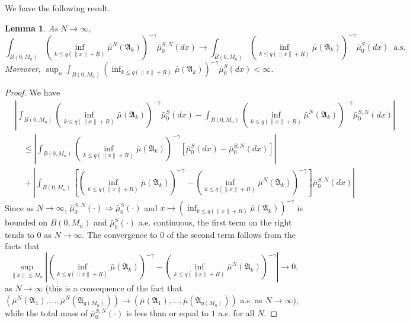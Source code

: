 \documentclass[notitlepage,reqno,11pt]{amsart}
\numberwithin{equation}{section}
\newtheorem{lemma}{Lemma}[section]
\begin{document}
We have the following result.
\begin{lemma}
\label{lemEP}
As $N\to\infty$,
\[\int_{B(0,M_n)}\left(\inf_{k\le q(\|x\|+\underline{R})}\bar{\mu}^N(\mathfrak{A}_k)\right)^{-\gamma}\bar{\mu}^{S,N}_0(dx)
\to\int_{B(0,M_n)}\left(\inf_{k\le q(\|x\|+\underline{R})}\bar{\mu}(\mathfrak{A}_k)\right)^{-\gamma}\bar{\mu}^{S}_0(dx)\ \text{ a.s.}\]
Moreover, 
$\displaystyle \sup_n\int_{B(0,M_n)}\left(\inf_{k\le q(\|x\|+\underline{R})}\bar{\mu}(\mathfrak{A}_k)\right)^{-\gamma}\bar{\mu}^{S}_0(dx)<\infty$.
\end{lemma}
\begin{proof}
We have
\begin{align*}
&\left|\int_{B(0,M_n)}\left(\inf_{k\le q(\|x\|+\underline{R})}\bar{\mu}(\mathfrak{A}_k)\right)^{-\gamma}\bar{\mu}^{S}_0(dx)-
\int_{B(0,M_n)}\left(\inf_{k\le q(\|x\|+\underline{R})}\bar{\mu}^N(\mathfrak{A}_k)\right)^{-\gamma}\bar{\mu}^{S,N}_0(dx)\right|\\
&\quad \le\left|\int_{B(0,M_n)}\left(\inf_{k\le q(\|x\|+\underline{R})}\bar{\mu}(\mathfrak{A}_k)\right)^{-\gamma}\left[\bar{\mu}^{S}_0(dx)-
\bar{\mu}^{S,N}_0(dx)\right]\right|\\
&\quad+\left|\int_{B(0,M_n)}\left[\left(\inf_{k\le q(\|x\|+\underline{R})}\bar{\mu}(\mathfrak{A}_k)\right)^{-\gamma}-
\left(\inf_{k\le q(\|x\|+\underline{R})}\bar{\mu}^N(\mathfrak{A}_k)\right)^{-\gamma}\right]\bar{\mu}^{S,N}_0(dx)\right|
\end{align*}
Since  as $N\to\infty$, $\bar{\mu}^{S,N}_0(\cdot)\Rightarrow\bar{\mu}^{S}_0(\cdot)$ and 
$x\mapsto\left(\inf_{k\le q(\|x\|+\underline{R})}\bar{\mu}(\mathfrak{A}_k)\right)^{-\gamma}$ is bounded on $B(0,M_n)$ and 
$\bar{\mu}^{S}_0(\cdot)$ a.e. continuous, the first term on the right tends to $0$ as $N\to\infty$. The convergence to 
$0$ of the second term follows from the facts that 
\[ \sup_{\|x\|\le M_n}\left|\left(\inf_{k\le q(\|x\|+\underline{R})}\bar{\mu}(\mathfrak{A}_k)\right)^{-\gamma}-
\left(\inf_{k\le q(\|x\|+\underline{R})}\bar{\mu}^N(\mathfrak{A}_k)\right)^{-\gamma}\right|\to0,\]
as $N\to\infty$ (this is a consequence of the fact that $(\bar{\mu}^N(\mathfrak{A}_1),\ldots,\bar{\mu}^N(\mathfrak{A}_{q(M_n)}))\to
(\bar{\mu}(\mathfrak{A}_1),\ldots,\bar{\mu}(\mathfrak{A}_{q(M_n)}))$ a.s. as $N\to\infty$), while the total mass of $\bar{\mu}^{S,N}_0(\cdot)$ is less than or equal to $1$ a.s. for all $N$.


\end{proof}
\end{document}
